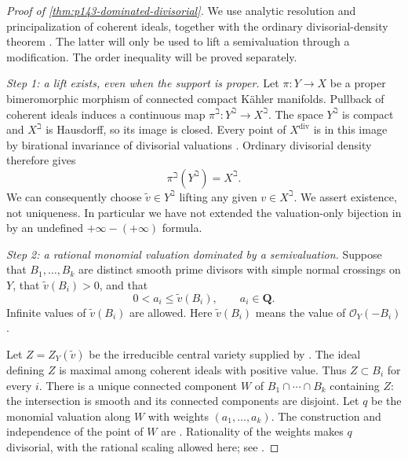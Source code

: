 \begin{proof}[Proof of \cref{thm:p143-dominated-divisorial}]
We use analytic resolution and principalization of coherent ideals,
together with the ordinary divisorial-density theorem
\cite[Theorem~2.3.6]{MP24}. The latter will only be used to lift a
semivaluation through a modification. The order inequality will be
proved separately.

\medskip\noindent
\emph{Step 1: a lift exists, even when the support is proper.}
Let \(\pi:Y\to X\) be a proper bimeromorphic morphism of connected
compact K\"ahler manifolds. Pullback of coherent ideals induces a
continuous map \(\pi^\beth:Y^\beth\to X^\beth\).
The space \(Y^\beth\) is compact and \(X^\beth\) is Hausdorff, so its
image is closed. Every point of \(X^{\mathrm{div}}\) is in this image
by birational invariance of divisorial valuations
\cite[Remark~2.3.2]{MP24}. Ordinary divisorial density therefore gives
\[
                           \pi^\beth(Y^\beth)=X^\beth.
\]
We can consequently choose \(\widetilde v\in Y^\beth\) lifting any
given \(v\in X^\beth\). We assert existence, not uniqueness. In
particular we have not extended the valuation-only bijection in
\cite[Proposition~2.1.6]{MP24} by an undefined
\(+\infty-(+\infty)\) formula.

\medskip\noindent
\emph{Step 2: a rational monomial valuation dominated by a semivaluation.}
Suppose that \(B_1,\ldots,B_k\) are distinct smooth prime divisors
with simple normal crossings on \(Y\), that
\(\widetilde v(B_i)>0\), and that
\[
                0<a_i\leq\widetilde v(B_i),\qquad a_i\in\mathbf Q .
\]
Infinite values of \(\widetilde v(B_i)\) are allowed.
Here \(\widetilde v(B_i)\) means the value of
\(\mathcal O_Y(-B_i)\).

Let \(Z=Z_Y(\widetilde v)\) be the irreducible central variety supplied
by \cite[Lemma~2.1.1]{MP24}. The ideal defining \(Z\) is maximal among
coherent ideals with positive value. Thus \(Z\subset B_i\) for every
\(i\). There is a unique connected component \(W\) of
\(B_1\cap\cdots\cap B_k\) containing \(Z\): the intersection is smooth
and its connected components are disjoint. Let \(q\) be the monomial
valuation along \(W\) with weights \((a_1,\ldots,a_k)\).
The construction and independence of the point of \(W\) are
\cite[Section~2.3.1, Proposition~2.3.4]{MP24}.
Rationality of the weights makes \(q\) divisorial, with the rational
scaling allowed here; see \cite[Remark~2.3.5]{MP24}.


\end{proof}
